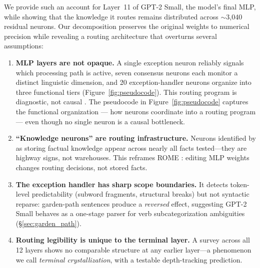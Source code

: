 \documentclass{article}
\begin{document}
We provide such an account for Layer~11 of GPT-2 Small, the model's final MLP, while showing that the knowledge it routes remains distributed across $\sim$3{,}040 residual neurons.
Our decomposition preserves the original weights to numerical precision while revealing
a routing architecture that overturns several assumptions:

\begin{enumerate}
\item \textbf{MLP layers are not opaque.}
A single exception neuron reliably signals which processing path is active,
seven consensus neurons each monitor a distinct linguistic dimension, and
20 exception-handler neurons organize into three functional tiers
(Figure~\ref{fig:pseudocode}).
This routing program is diagnostic, not causal \citep{balogh2026discrete}.
The pseudocode in Figure~\ref{fig:pseudocode} captures the functional
organization --- how neurons coordinate into a routing program --- even though
no single neuron is a causal bottleneck.

\item \textbf{``Knowledge neurons'' are routing infrastructure.}
Neurons identified by \citet{dai2022knowledge} as storing factual knowledge
appear across nearly all facts tested---they are highway signs, not warehouses.
This reframes ROME \citep{meng2022locating}: editing MLP weights changes
routing decisions, not stored facts.

\item \textbf{The exception handler has sharp scope boundaries.}
It detects token-level predictability (subword fragments, structural breaks)
but not syntactic reparse: garden-path sentences produce a \emph{reversed}
effect, suggesting GPT-2 Small behaves as a one-stage parser for verb
subcategorization ambiguities (\S\ref{sec:garden_path}).

\item \textbf{Routing legibility is unique to the terminal layer.}
A survey across all 12 layers shows no comparable structure at any earlier
layer---a phenomenon we call \emph{terminal crystallization}, with a testable
depth-tracking prediction.
\end{enumerate}
\end{document}
